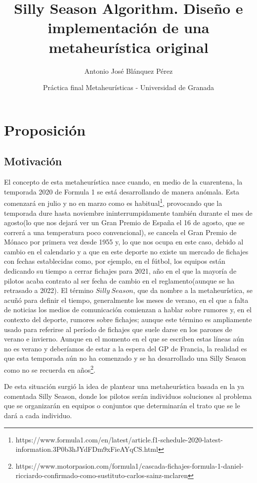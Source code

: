 \documentclass{article}
\title{\textbf{Silly Season Algorithm. Diseño e implementación de una metaheurística original}}
\author{Antonio José Blánquez Pérez}
\date{Práctica final Metaheurísticas - Universidad de Granada}
\begin{document}
	\setlength{\parskip}{1em}
	\maketitle
	
	\section{Proposición}
	\subsection{Motivación}
	\indent El concepto de esta metaheurística nace cuando, en medio de la cuarentena, la temporada 2020 de Formula 1 se está desarrollando de manera anómala. Esta comenzará en julio y no en marzo como es habitual\footnote{https://www.formula1.com/en/latest/article.f1-schedule-2020-latest-information.3P0b3hJYdFDm9xFieAYqCS.html}, provocando que la temporada dure hasta noviembre ininterrumpidamente también durante el mes de agosto(lo que nos dejará ver un Gran Premio de España el 16 de agosto, que se correrá a una temperatura poco convencional), se cancela el Gran Premio de Mónaco por primera vez desde 1955 y, lo que nos ocupa en este caso, debido al cambio en el calendario y a que en este deporte no existe un mercado de fichajes con fechas establecidas como, por ejemplo, en el fútbol, los equipos están dedicando su tiempo a cerrar fichajes para 2021, año en el que la mayoría de pilotos acaba contrato al ser fecha de cambio en el reglamento(aunque se ha retrasado a 2022). El término $Silly\ Season$, que da nombre a la metaheurística, se acuñó para definir el tiempo, generalmente los meses de verano, en el que a falta de noticias los medios de comunicación comienzan a hablar sobre rumores y, en el contexto del deporte, rumores sobre fichajes; aunque este término es ampliamente usado para referirse al período de fichajes que suele darse en los parones de verano e invierno. Aunque en el momento en el que se escriben estas líneas aún no es verano y deberíamos de estar a la espera del GP de Francia, la realidad es que esta temporada aún no ha comenzado y se ha desarrollado una Silly Season como no se recuerda en años\footnote{https://www.motorpasion.com/formula1/cascada-fichajes-formula-1-daniel-ricciardo-confirmado-como-sustituto-carlos-sainz-mclaren}.
	\par
	De esta situación surgió la idea de plantear una metaheurística basada en la ya comentada Silly Season, donde los pilotos serán individuos soluciones al problema que se organizarán en equipos o conjuntos que determinarán el trato que se le dará a cada individuo.
	
\end{document}
